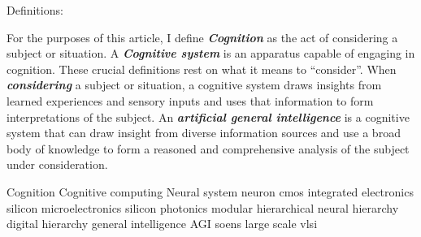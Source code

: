 Definitions:

\vspace{3em}
For the purposes of this article, I define \textbf{\textit{Cognition}} as the act of considering a subject or situation. A \textbf{\textit{Cognitive system}} is an apparatus capable of engaging in cognition. These crucial definitions rest on what it means to ``consider''. When \textbf{\textit{considering}} a subject or situation, a cognitive system draws insights from learned experiences and sensory inputs and uses that information to form interpretations of the subject. An \textbf{\textit{artificial general intelligence}} is a cognitive system that can draw insight from diverse information sources and use a broad body of knowledge to form a reasoned and comprehensive analysis of the subject under consideration. 

\vspace{3em}
Cognition
Cognitive computing
Neural system
neuron
cmos
integrated electronics
silicon microelectronics
silicon photonics
modular 
hierarchical
neural hierarchy
digital hierarchy
general intelligence
AGI
soens
large scale
vlsi
